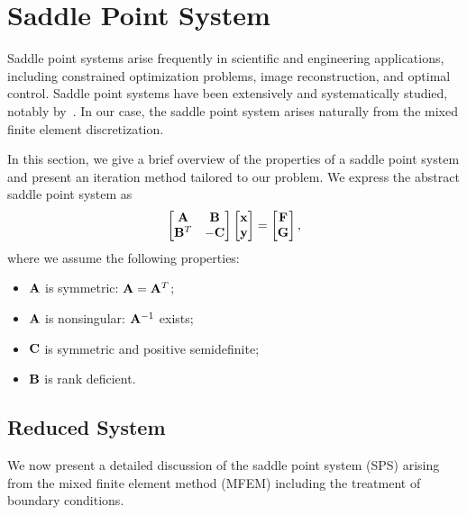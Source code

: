 \section{Saddle Point System}
\label{sec:saddle}
Saddle point systems arise frequently in scientific and engineering applications, including 
constrained optimization problems, image reconstruction, and optimal control.
Saddle point systems have been extensively and systematically studied, notably
by~\cite{Benzi_Golub_Liesen_2005}.
In our case, the saddle point system arises naturally from the mixed finite 
element discretization.

In this section,
we give a brief overview of the properties of a saddle point 
system and present an iteration method tailored to our problem.
We express the abstract saddle point system as 
\begin{equation}\label{eq:saddle}
		  \begin{bmatrix}
					 \bold{A} & \bold{B} \\
					 \bold{B}^T &\bold{-C}
		  \end{bmatrix}\begin{bmatrix}
					 \bold{x}\\
					 \bold{y}
		  \end{bmatrix} = \begin{bmatrix}
					 \bold{F}\\
					 \bold{G}
		  \end{bmatrix},
\end{equation}
where we assume the following properties:
\begin{itemize}
		  \item $\bold{A}$ is symmetric: $\bold{A} = \bold{A}^T$;
		  \item $\bold{A}$ is nonsingular: $\bold{A}^{-1}$ exists;
		  \item $\bold{C}$ is symmetric and positive semidefinite;
		  \item $\bold{B}$ is rank deficient.
\end{itemize}

\subsection{Reduced System}
We now present a detailed discussion of the saddle point system (SPS) arising from the mixed finite element method (MFEM)
including the treatment of boundary conditions.


